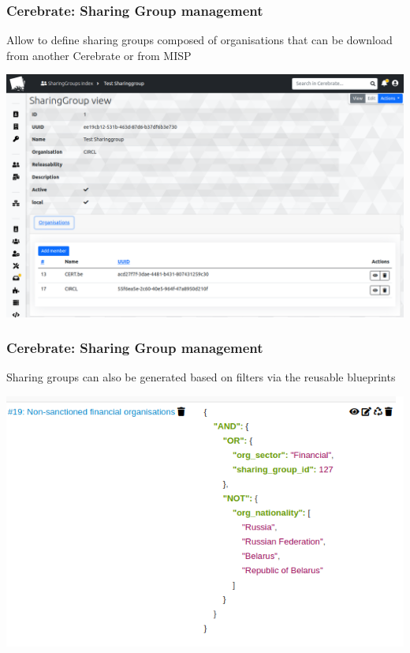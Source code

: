 \begin{frame}
    \frametitle{Cerebrate: Sharing Group management}
    Allow to define sharing groups composed of organisations that can be download from another Cerebrate or from MISP
    \begin{center}
        \includegraphics[width=1.00\linewidth]{pictures/cerebrate-sg.png}
    \end{center}
\end{frame}

\begin{frame}
    \frametitle{Cerebrate: Sharing Group management}
    Sharing groups can also be generated based on filters via the reusable blueprints
    \begin{center}
        \includegraphics[width=0.88\linewidth]{pictures/misp-sg-blueprint.png}
    \end{center}
\end{frame}

